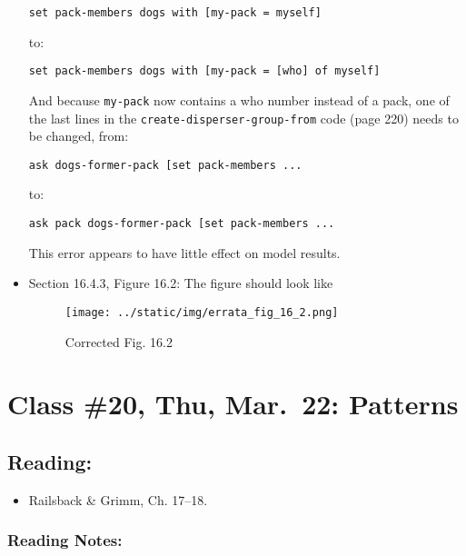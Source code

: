 \documentclass[]{article}
\providecommand{\tightlist}{%
  \setlength{\itemsep}{0pt}\setlength{\parskip}{0pt}}
\begin{document}
\begin{itemize}
\begin{verbatim}
set pack-members dogs with [my-pack = myself]
\end{verbatim}

  to:

\begin{verbatim}
set pack-members dogs with [my-pack = [who] of myself]
\end{verbatim}

  And because \texttt{my-pack} now contains a who number instead of a
  pack, one of the last lines in the
  \texttt{create-disperser-group-from} code (page 220) needs to be
  changed, from:

\begin{verbatim}
ask dogs-former-pack [set pack-members ... 
\end{verbatim}

  to:

\begin{verbatim}
ask pack dogs-former-pack [set pack-members ...
\end{verbatim}

  This error appears to have little effect on model results.
\item
  Section 16.4.3, Figure 16.2: The figure should look like

  \begin{figure}
  \centering
  \texttt{[image: ../static/img/errata\_fig\_16\_2.png]}
  \caption{Corrected Fig. 16.2}
  \end{figure}
\end{itemize}

\hypertarget{class-20-thu-mar.22-patterns}{%
\section{Class \#20, Thu, Mar.~22:
Patterns}\label{class-20-thu-mar.22-patterns}}

\hypertarget{reading-19}{%
\subsection{Reading:}\label{reading-19}}

\begin{itemize}
\tightlist
\item
  Railsback \& Grimm, Ch. 17--18.
\end{itemize}

\hypertarget{reading-notes-15}{%
\subsubsection{Reading Notes:}\label{reading-notes-15}}
\end{document}
